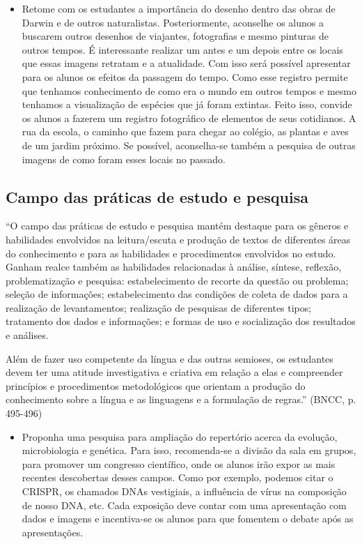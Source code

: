 \documentclass[12pt]{extarticle}
\begin{document}
\begin{itemize} \item Retome com os estudantes a importância do desenho dentro
      das obras de Darwin e de outros naturalistas. Posteriormente, aconselhe
      os alunos a buscarem outros desenhos de viajantes, fotografias e mesmo
      pinturas de outros tempos. É interessante realizar um antes e um depois
      entre os locais que essas imagens retratam e a atualidade. Com isso será
      possível apresentar para os alunos os efeitos da passagem do tempo.  Como
      esse registro permite que tenhamos conhecimento de como era o mundo em
      outros tempos e mesmo tenhamos a visualização de espécies que já foram
      extintas. Feito isso, convide os alunos a fazerem um registro fotográfico
      de elementos de seus cotidianos. A rua da escola, o caminho que fazem
      para chegar ao colégio, as plantas e aves de um jardim próximo. Se
  possível, aconselha-se também a pesquisa de outras imagens de como foram
  esses locais no passado.  \end{itemize}

\subsection{Campo das práticas de estudo e pesquisa}

``O campo das práticas de estudo e pesquisa mantém destaque para os gêneros
e habilidades envolvidos na leitura/escuta e produção de textos de diferentes
áreas do conhecimento e para as habilidades e procedimentos envolvidos no
estudo. Ganham realce também as habilidades relacionadas à análise, síntese,
reflexão, problematização e pesquisa: estabelecimento de recorte da questão ou
problema; seleção de informações; estabelecimento das condições de coleta de
dados para a realização de levantamentos; realização de pesquisas de diferentes
tipos; tratamento dos dados e informações; e formas de uso e socialização dos
resultados e análises.

Além de fazer uso competente da língua e das outras semioses, os estudantes
devem ter uma atitude investigativa e criativa em relação a elas e compreender
princípios e procedimentos metodológicos que orientam a produção do
conhecimento sobre a língua e as linguagens e a formulação de regras.'' (BNCC,
p. 495-496)

\begin{itemize} \item Proponha uma pesquisa para ampliação do repertório acerca
      da evolução, microbiologia e genética. Para isso, recomenda-se a divisão
      da sala em grupos, para promover um congresso científico, onde os alunos
      irão expor as mais recentes descobertas desses campos. Como por exemplo,
      podemos citar o CRISPR, os chamados DNAs vestigiais, a influência de
      vírus na composição de nosso DNA, etc. Cada exposição deve contar com uma
      apresentação com dados e imagens e incentiva-se os alunos para que
  fomentem o debate após as apresentações.  \end{itemize}
\end{document}
